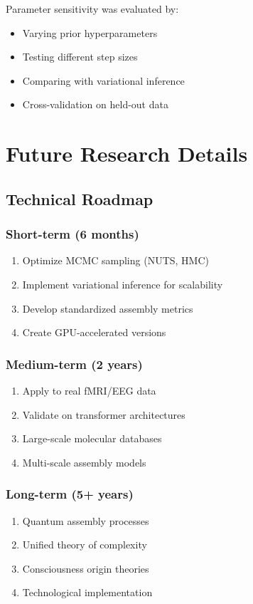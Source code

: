 \documentclass[11pt,a4paper]{article}
\begin{document}
Parameter sensitivity was evaluated by:
\begin{itemize}
    \item Varying prior hyperparameters
    \item Testing different step sizes
    \item Comparing with variational inference
    \item Cross-validation on held-out data
\end{itemize}

\section{Future Research Details}
\label{app:future}

\subsection{Technical Roadmap}

\subsubsection{Short-term (6 months)}
\begin{enumerate}
    \item Optimize MCMC sampling (NUTS, HMC)
    \item Implement variational inference for scalability
    \item Develop standardized assembly metrics
    \item Create GPU-accelerated versions
\end{enumerate}

\subsubsection{Medium-term (2 years)}
\begin{enumerate}
    \item Apply to real fMRI/EEG data
    \item Validate on transformer architectures
    \item Large-scale molecular databases
    \item Multi-scale assembly models
\end{enumerate}

\subsubsection{Long-term (5+ years)}
\begin{enumerate}
    \item Quantum assembly processes
    \item Unified theory of complexity
    \item Consciousness origin theories
    \item Technological implementation
\end{enumerate}
\end{document}
